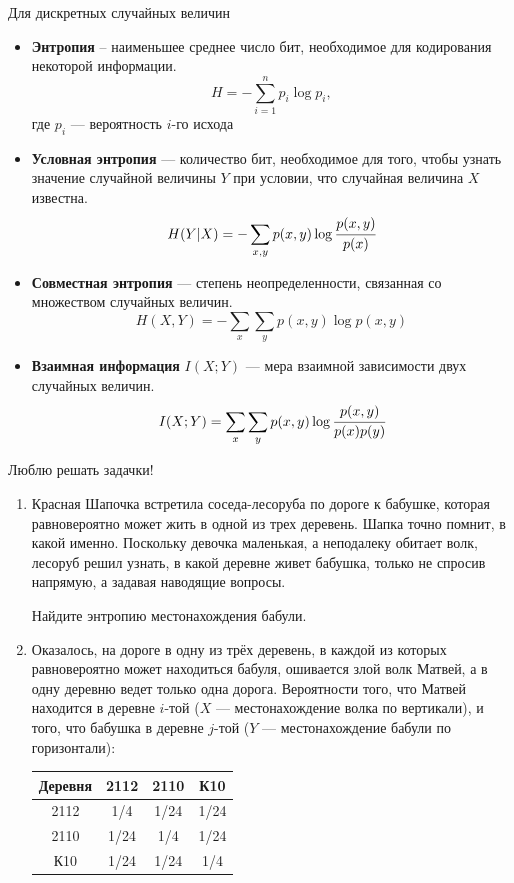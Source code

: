 \documentclass[final]{beamer}
\newlength{\onecolwid}
\begin{document}
\begin{frame}[t]
\begin{columns}[t]
\begin{column}{\onecolwid}
\begin{block}{Для дискретных случайных величин}
\begin{itemize}
	\item \textbf{Энтропия} -- наименьшее среднее число бит, необходимое для кодирования некоторой информации.
    \[H=-\sum\limits_{i=1}^n p_i\log p_i, \]
    где $p_i$ --- вероятность $i$-го исхода    
    \item \textbf{Условная энтропия} --- количество бит, необходимое для того, чтобы узнать значение случайной величины $Y$ при условии, что случайная величина $X$ известна.
    \[H(Y|X)=-\sum\limits_{x, y} p(x, y)\log \cfrac{p(x, y)}{p(x)} \]
    \item \textbf{Совместная энтропия} --- степень неопределенности, связанная со множеством случайных величин.
    \[H(X, Y)=-\sum\limits_{x}\sum\limits_{y} p(x, y)\log p(x ,y) \]
    \item \textbf{Взаимная информация} $I(X; Y)$ --- мера взаимной зависимости двух случайных величин.
    \[I(X; Y) = \sum\limits_{x}\sum\limits_{y} p(x, y)\log \cfrac{p(x, y)}{p(x)p(y)} \]
\end{itemize}
\end{block}


\begin{alertblock}{Люблю решать задачки!}
	\begin{enumerate}
		\item Красная Шапочка встретила соседа-лесоруба по дороге к бабушке, которая равновероятно может жить в одной из трех деревень. Шапка точно помнит, в какой именно. Поскольку девочка маленькая, а неподалеку обитает волк, лесоруб решил узнать, в какой деревне живет бабушка, только не спросив напрямую, а задавая наводящие вопросы. 

		Найдите энтропию местонахождения бабули. 
	
		\item Оказалось, на дороге в одну из трёх деревень, в каждой из которых равновероятно может находиться бабуля, ошивается злой волк Матвей, а в одну деревню ведет только одна дорога. Вероятности того, что Матвей находится в деревне $i$-той ($X$ --- местонахождение волка по вертикали), и того, что бабушка в деревне $j$-той ($Y$ --- местонахождение бабули по горизонтали):
		\begin{center}
			\begin{tabular}{c||c|c|c}
				Деревня & 2112 & 2110 & К10 \\
				\hline
				\hline
				2112 & 1/4 & 1/24 & 1/24 \\
				\hline
				2110 & 1/24 & 1/4 & 1/24 \\
				\hline
				К10 & 1/24 & 1/24 & 1/4 \\
			\end{tabular}
		\end{center}
		

\end{enumerate}
\end{alertblock}
\end{column}
\end{columns}
\end{frame}
\end{document}
